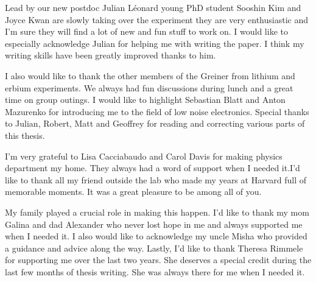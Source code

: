 Lead by our new postdoc Julian L\'eonard young PhD student Sooshin Kim and Joyce Kwan are slowly taking over the experiment they are very enthusiastic and I'm sure they will find a lot of new and fun stuff to work on. I would like to especially acknowledge Julian for helping me with writing the paper. I think my writing skills have been greatly improved thanks to him. 

I also would like to thank the other members of the Greiner from lithium and erbium experiments. We always had fun discussions during lunch and a great time on group outings. I would like to highlight Sebastian Blatt and Anton Mazurenko for introducing me to the field of low noise electronics. Special thanks to Julian, Robert, Matt and Geoffrey for reading and correcting various parts of this thesis.

I'm very grateful to Lisa Cacciabaudo and Carol Davis for making physics department my home. They always had a word of support when I needed it.I'd like to thank all my friend outside the lab who made my years at Harvard full of memorable moments. It was a great pleasure to be among all of you.

My family played a crucial role in making this happen. I'd like to thank my mom Galina and dad Alexander who never lost hope in me and always supported me when I needed it. I also would like to acknowledge my uncle Misha who provided a guidance and advice along the way. Lastly, I'd like to thank Theresa Rimmele for supporting me over the last two years. She deserves a special credit during the last few months of thesis writing. She was always there for me when I needed it.
